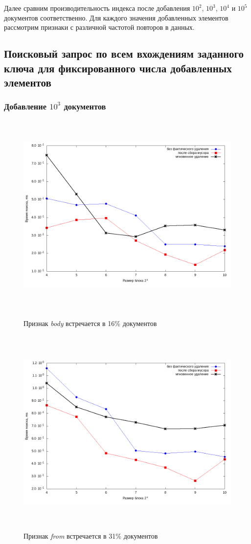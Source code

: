 Далее сравним производительность индекса после добавления $10^2$, $10^3$, $10^4$ и $10^5$
документов соответственно. Для каждого значения добавленных элементов рассмотрим
признаки с различной частотой повторов в данных.\nopagebreak[4]

\subsection{Поисковый запрос по всем вхождениям заданного ключа для фиксированного числа добавленных элементов}

\subsubsection{Добавление $10^3$ документов}

\begin{figure}[H]
\includegraphics[width=\linewidth, height=10.25cm]{fig/limit_1e6/1e3/body.png}
\caption{Признак \textit{body} встречается в 16\% документов}
\includegraphics[width=\linewidth, height=10.5cm]{fig/limit_1e6/1e3/from.png}
\caption{Признак \textit{from} встречается в 31\% документов}
\end{figure}


